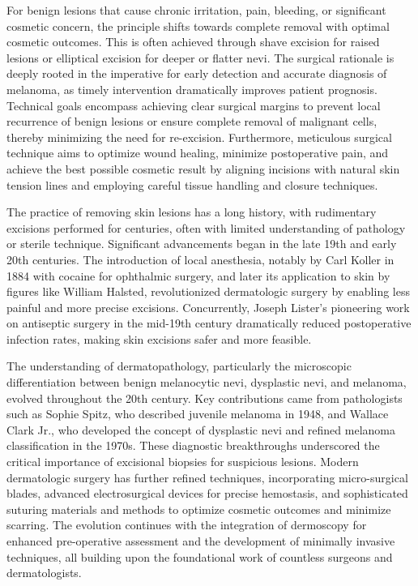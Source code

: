 For benign lesions that cause chronic irritation, pain, bleeding, or significant cosmetic concern, the principle shifts towards complete removal with optimal cosmetic outcomes. This is often achieved through shave excision for raised lesions or elliptical excision for deeper or flatter nevi. The surgical rationale is deeply rooted in the imperative for early detection and accurate diagnosis of melanoma, as timely intervention dramatically improves patient prognosis. Technical goals encompass achieving clear surgical margins to prevent local recurrence of benign lesions or ensure complete removal of malignant cells, thereby minimizing the need for re-excision. Furthermore, meticulous surgical technique aims to optimize wound healing, minimize postoperative pain, and achieve the best possible cosmetic result by aligning incisions with natural skin tension lines and employing careful tissue handling and closure techniques.

The practice of removing skin lesions has a long history, with rudimentary excisions performed for centuries, often with limited understanding of pathology or sterile technique. Significant advancements began in the late 19th and early 20th centuries. The introduction of local anesthesia, notably by Carl Koller in 1884 with cocaine for ophthalmic surgery, and later its application to skin by figures like William Halsted, revolutionized dermatologic surgery by enabling less painful and more precise excisions. Concurrently, Joseph Lister's pioneering work on antiseptic surgery in the mid-19th century dramatically reduced postoperative infection rates, making skin excisions safer and more feasible.

The understanding of dermatopathology, particularly the microscopic differentiation between benign melanocytic nevi, dysplastic nevi, and melanoma, evolved throughout the 20th century. Key contributions came from pathologists such as Sophie Spitz, who described juvenile melanoma in 1948, and Wallace Clark Jr., who developed the concept of dysplastic nevi and refined melanoma classification in the 1970s. These diagnostic breakthroughs underscored the critical importance of excisional biopsies for suspicious lesions. Modern dermatologic surgery has further refined techniques, incorporating micro-surgical blades, advanced electrosurgical devices for precise hemostasis, and sophisticated suturing materials and methods to optimize cosmetic outcomes and minimize scarring. The evolution continues with the integration of dermoscopy for enhanced pre-operative assessment and the development of minimally invasive techniques, all building upon the foundational work of countless surgeons and dermatologists.

